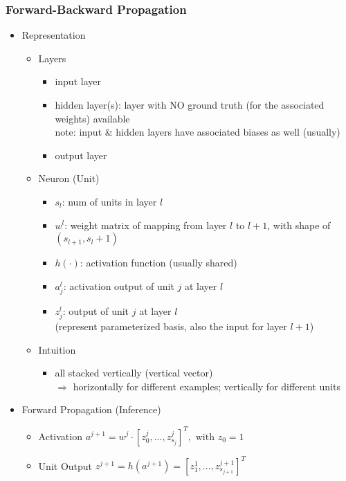 \subsubsection{Forward-Backward Propagation}
\begin{itemize}
\item Representation
	\begin{itemize}
	\item Layers
		\begin{itemize}
		\item input layer
		\item hidden layer(s): layer with NO ground truth (for the associated weights) available \\
		note: input \& hidden layers have associated biases as well (usually)
		\item output layer
		\end{itemize}
	\item Neuron (Unit)
		\begin{itemize}
		\item $s_l$: num of units in layer $l$
		\item $w^l$: weight matrix of mapping from layer $l$ to $l+1$, with shape of $\left( s_{l+1}, s_l + 1 \right)$
		\item $h(\cdot)$: activation function (usually shared)
		\item $a_j^l$: activation output of unit $j$ at layer $l$
		\item $z_j^l$: output of unit $j$ at layer $l$ \\ 
		(represent parameterized basis, also the input for layer $l+1$)
		
		\end{itemize}
	\item Intuition
		\begin{itemize}
		\item all stacked vertically (vertical vector) \\
		$\Rightarrow$ horizontally for different examples; vertically for different units
		\end{itemize}
	\end{itemize}
	
\item Forward Propagation (Inference)
	\begin{itemize}
	\item Activation $a^{j+1} = w^j \cdot [z_0^j, ..., z_{s_j}^j]^T, \text{ with } z_0=1$
	\item Unit Output $z^{j+1} = h(a^{j+1}) = [z_1^{1}, ..., z^{j+1}_{s_{j+1}}]^T$
	\end{itemize}


\end{itemize}
